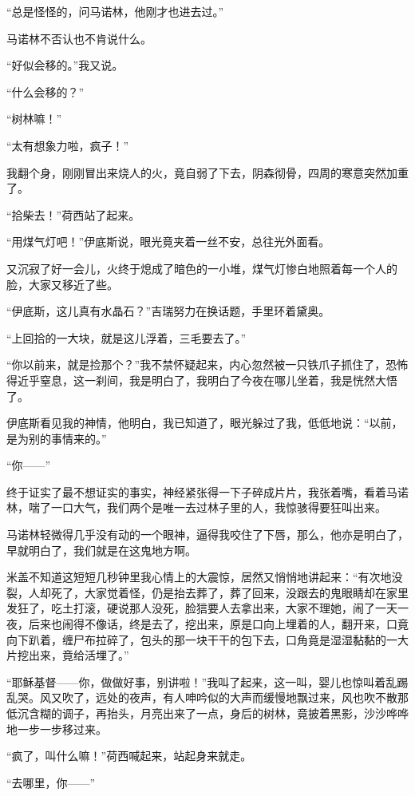 \par “总是怪怪的，问马诺林，他刚才也进去过。”
\par 马诺林不否认也不肯说什么。
\par “好似会移的。”我又说。
\par “什么会移的？”
\par “树林嘛！”
\par “太有想象力啦，疯子！”
\par 我翻个身，刚刚冒出来烧人的火，竟自弱了下去，阴森彻骨，四周的寒意突然加重了。
\par “拾柴去！”荷西站了起来。
\par “用煤气灯吧！”伊底斯说，眼光竟夹着一丝不安，总往光外面看。
\par 又沉寂了好一会儿，火终于熄成了暗色的一小堆，煤气灯惨白地照着每一个人的脸，大家又移近了些。
\par “伊底斯，这儿真有水晶石？”吉瑞努力在换话题，手里环着黛奥。
\par “上回拾的一大块，就是这儿浮着，三毛要去了。”
\par “你以前来，就是捡那个？”我不禁怀疑起来，内心忽然被一只铁爪子抓住了，恐怖得近乎窒息，这一刹间，我是明白了，我明白了今夜在哪儿坐着，我是恍然大悟了。
\par 伊底斯看见我的神情，他明白，我已知道了，眼光躲过了我，低低地说：“以前，是为别的事情来的。”
\par “你——”
\par 终于证实了最不想证实的事实，神经紧张得一下子碎成片片，我张着嘴，看着马诺林，喘了一口大气，我们两个是唯一去过林子里的人，我惊骇得要狂叫出来。
\par 马诺林轻微得几乎没有动的一个眼神，逼得我咬住了下唇，那么，他亦是明白了，早就明白了，我们就是在这鬼地方啊。
\par 米盖不知道这短短几秒钟里我心情上的大震惊，居然又悄悄地讲起来：“有次地没裂，人却死了，大家觉着怪，仍是抬去葬了，葬了回来，没跟去的鬼眼睛却在家里发狂了，吃土打滚，硬说那人没死，脸狺要人去拿出来，大家不理她，闹了一天一夜，后来也闹得不像话，终是去了，挖出来，原是口向上埋着的人，翻开来，口竟向下趴着，缠尸布拉碎了，包头的那一块干干的包下去，口角竟是湿湿黏黏的一大片挖出来，竟给活埋了。”
\par “耶稣基督——你，做做好事，别讲啦！”我叫了起来，这一叫，婴儿也惊叫着乱踢乱哭。风又吹了，远处的夜声，有人呻吟似的大声而缓慢地飘过来，风也吹不散那低沉含糊的调子，再抬头，月亮出来了一点，身后的树林，竟披着黑影，沙沙哗哗地一步一步移过来。
\par “疯了，叫什么嘛！”荷西喊起来，站起身来就走。
\par “去哪里，你——”
